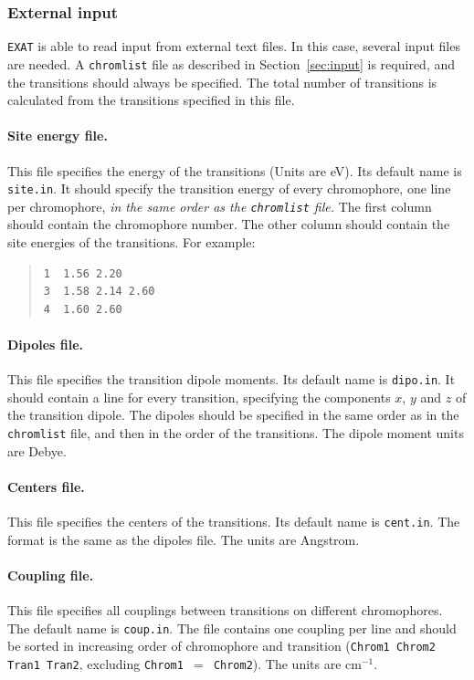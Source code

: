 \documentclass[a4paper,11pt]{article}
\begin{document}
\subsubsection{External input}\label{sec:input_ext}

\texttt{EXAT} is able to read input from external text files. In this case, several input files are needed. A \texttt{chromlist} file as described in Section~\ref{sec:input} is required, and the transitions should always be specified. The total number of transitions is calculated from the transitions specified in this file.

\paragraph*{Site energy file. } 
This file specifies the energy of the transitions (Units are eV). Its default name is \texttt{site.in}. It should specify the transition energy of every chromophore, one line per chromophore, \emph{in the same order as the \texttt{\emph{chromlist}} file.} The first column should contain the chromophore number. The other column should contain the site energies of the transitions. For example:

\begin{quote}
\begin{verbatim}
1  1.56 2.20
3  1.58 2.14 2.60
4  1.60 2.60
\end{verbatim}
\end{quote}

\paragraph*{Dipoles file. } 
This file specifies the transition dipole moments. Its default name is \texttt{dipo.in}. It should contain a line for every transition, specifying the components $x$, $y$ and $z$ of the transition dipole. The dipoles should be specified in the same order as in the \texttt{chromlist} file, and then in the order of the transitions. The dipole moment units are Debye.

\paragraph*{Centers file. } 
This file specifies the centers of the transitions. Its default name is \texttt{cent.in}. The format is the same as the dipoles file. The units are Angstrom.

\paragraph*{Coupling file. } 
This file specifies all couplings between transitions on different chromophores. The default name is \texttt{coup.in}. The file contains one coupling per line and should be sorted in increasing order of chromophore and transition (\texttt{Chrom1 Chrom2 Tran1 Tran2}, excluding \texttt{Chrom1 $=$ Chrom2}). The units are cm$^{-1}$.
\end{document}
